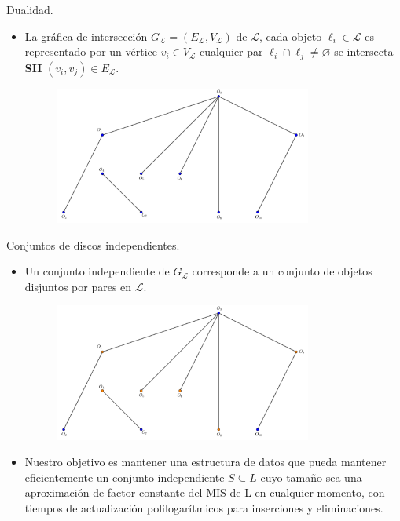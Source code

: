 \begin{frame}{Dualidad.}
  
  \begin{itemize}[<+->]
  \item La gráfica de intersección $G_{\mathcal{L}} = (E_{\mathcal{L}},V_{\mathcal{L}})$
    de $\mathcal{L}$, cada objeto $\ell_i \in \mathcal{L}$ es representado por un vértice
    $v_i \in V_{\mathcal{L}}$ cualquier par $\ell_i \cap \ell_j \not= \varnothing$ se intersecta
    \textbf{SII} $(v_i, v_j) \in E_{\mathcal{L}}$.
    \begin{figure}  
      \centering
      \includegraphics[width=0.8\textwidth]{./Images/Ejemplo02.png}
    \end{figure}
  \end{itemize}
\end{frame}

\begin{frame}{Conjuntos de discos independientes.}
  
  \begin{itemize}[<+->]
  \item Un conjunto independiente de $G_{\mathcal{L}}$ corresponde a un conjunto de objetos
    disjuntos por pares en $\mathcal{L}$.
    \begin{figure}  
      \centering
      \includegraphics[width=0.8\textwidth]{./Images/Ejemplo03.png}
    \end{figure}
  \item Nuestro objetivo es mantener una estructura de datos que pueda mantener
    eficientemente un conjunto independiente $S \subseteq L$ cuyo tamaño sea una aproximación
    de factor constante del MIS de L en cualquier momento, con tiempos de actualización
    polilogarítmicos para inserciones y eliminaciones.
  \end{itemize}
  
\end{frame}


